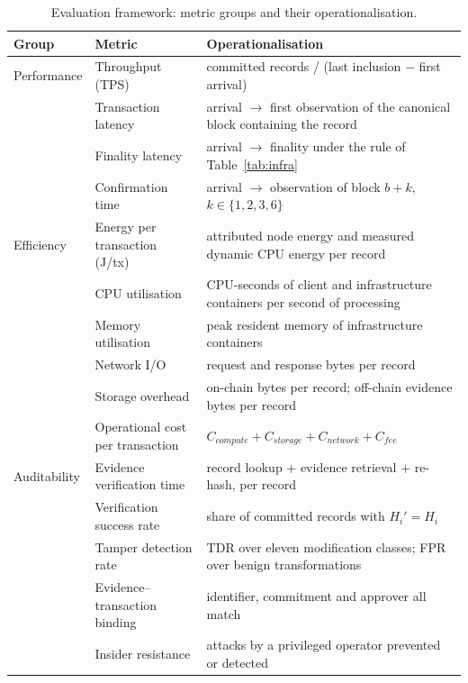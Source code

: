 \documentclass[10pt]{article}
\begin{document}
\begin{table}[H]
\centering\scriptsize
\caption{Evaluation framework: metric groups and their operationalisation.}\label{tab:metrics}
\begin{tabular}{p{2.1cm}p{4.3cm}p{8.6cm}}
\toprule
Group & Metric & Operationalisation \\
\midrule
Performance & Throughput (TPS) & committed records / (last inclusion $-$ first arrival) \\
 & Transaction latency & arrival $\rightarrow$ first observation of the canonical block containing the record \\
 & Finality latency & arrival $\rightarrow$ finality under the rule of Table~\ref{tab:infra} \\
 & Confirmation time & arrival $\rightarrow$ observation of block $b+k$, $k\in\{1,2,3,6\}$ \\
\midrule
Efficiency & Energy per transaction (J/tx) & attributed node energy and measured dynamic CPU energy per record \\
 & CPU utilisation & CPU-seconds of client and infrastructure containers per second of processing \\
 & Memory utilisation & peak resident memory of infrastructure containers \\
 & Network I/O & request and response bytes per record \\
 & Storage overhead & on-chain bytes per record; off-chain evidence bytes per record \\
 & Operational cost per transaction & $C_{\mathit{compute}}+C_{\mathit{storage}}+C_{\mathit{network}}+C_{\mathit{fee}}$ \\
\midrule
Auditability & Evidence verification time & record lookup + evidence retrieval + re-hash, per record \\
 & Verification success rate & share of committed records with $H_i'=H_i$ \\
 & Tamper detection rate & TDR over eleven modification classes; FPR over benign transformations \\
 & Evidence--transaction binding & identifier, commitment and approver all match \\
 & Insider resistance & attacks by a privileged operator prevented or detected \\
\bottomrule
\end{tabular}
\end{table}
\end{document}
